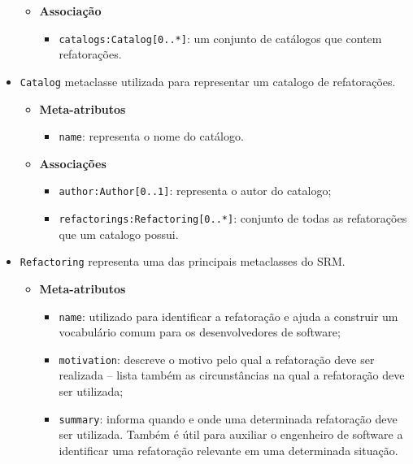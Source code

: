 \begin{itemize}
\begin{itemize}
	\item \textbf{Associação}
		\begin{itemize}
			\item \texttt{catalogs:Catalog[0..*]}: um conjunto de catálogos que contem refatorações.
		\end{itemize}	
\end{itemize} 

\item \texttt{Catalog} metaclasse utilizada para representar um catalogo de refatorações.

\begin{itemize}
	\item \textbf{Meta-atributos}
		\begin{itemize}
			\item \texttt{name}: representa o nome do catálogo. 
		\end{itemize}	
\end{itemize} 

\begin{itemize}
	\item \textbf{Associações}
		\begin{itemize}
			\item \texttt{author:Author[0..1]}: representa o autor do catalogo;
			\item \texttt{refactorings:Refactoring[0..*]}: conjunto de todas as refatorações que um catalogo possui.
		\end{itemize}	
\end{itemize} 

\item \texttt{Refactoring} representa uma das principais metaclasses do SRM.

\begin{itemize}
	\item \textbf{Meta-atributos}
		\begin{itemize}
			\item \texttt{name}: utilizado para identificar a refatoração e ajuda a construir um vocabulário comum para os desenvolvedores de software;
			\item \texttt{motivation}: descreve o motivo pelo qual a refatoração deve ser realizada – lista também as circunstâncias na qual a refatoração deve ser utilizada;
			\item \texttt{summary}: informa quando e onde uma determinada refatoração deve ser utilizada. Também é útil para auxiliar o engenheiro de software a identificar uma refatoração relevante em uma determinada situação. 
		\end{itemize}	
\end{itemize} 


\end{itemize}
